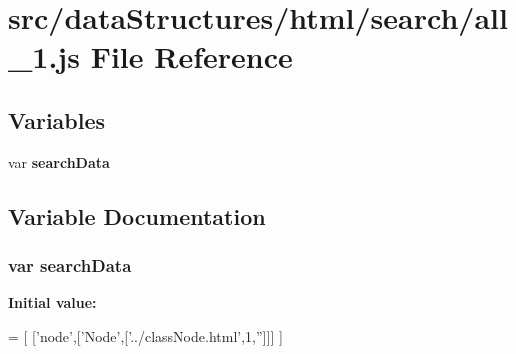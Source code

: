 \section{src/data\-Structures/html/search/all\-\_\-1.js File Reference}
\label{all__1_8js}
\subsection*{Variables}
\begin{DoxyCompactItemize}
\item 
var {\bf search\-Data}
\end{DoxyCompactItemize}


\subsection{Variable Documentation}
\subsubsection[{search\-Data}]{\setlength{\rightskip}{0pt plus 5cm}var search\-Data}\label{all__1_8js_ad01a7523f103d6242ef9b0451861231e}
{\bfseries Initial value\-:}
\begin{DoxyCode}
=
[
  [\textcolor{stringliteral}{'node'},[\textcolor{stringliteral}{'Node'},[\textcolor{stringliteral}{'../classNode.html'},1,\textcolor{stringliteral}{''}]]]
]
\end{DoxyCode}
